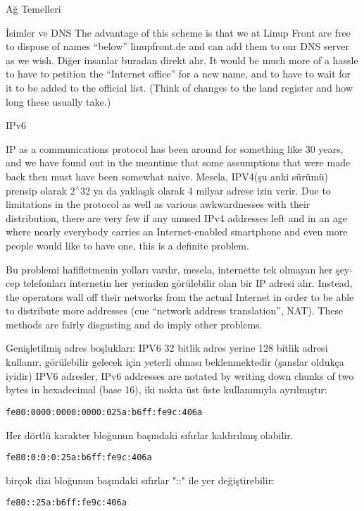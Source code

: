 \begin{section}{Ağ Temelleri}
\begin{subsection}{İsimler ve DNS}
The advantage of this scheme is that we at Linup Front are free to dispose of names “below” linupfront.de and can add them to our DNS server as we
wish. Diğer insanlar buradan direkt alır.  It would be much more of a hassle to have to petition the “Internet office” for a new name, and to have to wait for it to be added to the official list. (Think of changes to the land register and how long these usually take.)

\end{subsection}
\begin{subsection}{IPv6}

IP as a communications protocol has been around for something like 30 years, and we have found out in the meantime that some assumptions that were made back then must have been somewhat naive. Mesela, IPV4(şu anki sürümü) prensip olarak 2$ ^\wedge $32 ya da yaklaşık olarak 4 milyar adrese izin verir. Due to limitations in the protocol as well as various awkwardnesses with their distribution, there are very few if any unused IPv4 addresses left and in an age where nearly everybody carries an Internet-enabled smartphone and even more people would like to have one, this is a definite problem.

Bu problemi hafifletmenin yolları vardır, mesela, internette tek olmayan her şey-cep telefonları  internetin her yerinden görülebilir olan bir IP adresi alır. Instead, the operators wall off their networks from the actual Internet in order to be able to distribute more addresses (cue “network address translation”, NAT). These methods are fairly disgusting and do imply other problems.

Genişletilmiş adres boşlukları: IPV6 32  bitlik adres yerine 128 bitlik adresi kullanır, görülebilir gelecek için yeterli olması beklenmektedir (şanslar oldukça iyidir) IPV6 adresler,  IPv6 addresses are notated by writing down chunks of two
bytes in hexadecimal (base 16), iki nokta üst üste kullanımıyla ayrılmıştır:
\begin{verbatim}
fe80:0000:0000:0000:025a:b6ff:fe9c:406a
\end{verbatim}

Her dörtlü karakter bloğunun başındaki sıfırlar kaldırılmış olabilir.
\begin{verbatim}
fe80:0:0:0:25a:b6ff:fe9c:406a
\end{verbatim}
birçok dizi bloğunun başındaki sıfırlar "::" ile yer değiştirebilir:
\begin{verbatim}
fe80::25a:b6ff:fe9c:406a
\end{verbatim}


\end{subsection}
\end{section}
